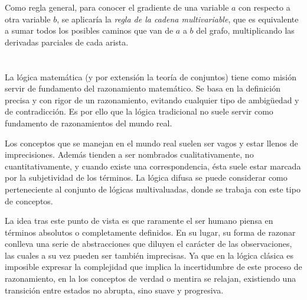 Como regla general, para conocer el gradiente de una variable $a$ con respecto a otra variable $b$, se aplicaría la \textit{regla de la cadena multivariable}, que es equivalente a sumar todos los posibles caminos que van de $a$ a $b$ del grafo, multiplicando las derivadas parciales de cada arista.

\section{}

La lógica matemática (y por extensión la teoría de conjuntos) tiene como misión servir de fundamento del razonamiento matemático. Se basa en la definición precisa y con rigor de un razonamiento, evitando cualquier tipo de ambigüedad y de contradicción. Es por ello que la lógica tradicional no suele servir como fundamento de razonamientos del mundo real.

Los conceptos que se manejan en el mundo real suelen ser vagos y estar llenos de imprecisiones. Además tienden a ser nombrados cualitativamente, no cuantitativamente, y cuando existe una correspondencia, ésta suele estar marcada por la subjetividad de los términos. La lógica difusa se puede considerar como perteneciente al conjunto de lógicas multivaluadas, donde se trabaja con este tipo de conceptos.

La idea tras este punto de vista es que raramente el ser humano piensa en términos absolutos o completamente definidos. En su lugar, su forma de razonar conlleva una serie de abstracciones que diluyen el carácter de las observaciones, las cuales a su vez pueden ser también imprecisas. Ya que en la lógica clásica es imposible expresar la complejidad que implica la incertidumbre de este proceso de razonamiento, en la  los conceptos de verdad o mentira se relajan, existiendo una transición entre estados no abrupta, sino suave y progresiva.

